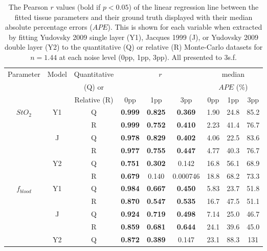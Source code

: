 \begin{table}[h!]
    \centering
    \caption{The Pearson $r$ values (bold if $p<0.05$) of the linear regression line between the fitted tissue parameters and their ground truth displayed with their median absolute percentage errors ($APE$). This is shown for each variable when extracted by fitting Yudovsky 2009 single layer (Y1), Jacques 1999 (J), or Yudovsky 2009 double layer (Y2) to the quantitative (Q) or relative (R) Monte-Carlo datasets for $n=1.44$ at each noise level (0pp, 1pp, 3pp). All presented to 3s.f.}
    \begin{tabular}{|ccc|ccc|ccc|}
        \hline
        Parameter & Model & Quantitative & \multicolumn{3}{c}{$r$} & \multicolumn{3}{|c|}{median} \\
        & & (Q) or & \multicolumn{3}{c}{} & \multicolumn{3}{|c|}{$APE$ (\%)} \\
        & & Relative (R) & 0pp & 1pp & 3pp & 0pp & 1pp & 3pp \\
        \hline
        \multirow{6}{*}{$StO_2$} & \multirow{2}{*}{Y1} & Q & \textbf{0.999} & \textbf{0.825} & \textbf{0.369} & 1.90 & 24.8 & 85.2 \\
        & & R & \textbf{0.999} & \textbf{0.752} & \textbf{0.410} & 2.23 & 41.4 & 76.7 \\
        \cline{2-9}
        & \multirow{2}{*}{J} & Q & \textbf{0.978} & \textbf{0.829} & \textbf{0.402} & 4.06 & 22.5 & 83.6 \\
        & & R & \textbf{0.977} & \textbf{0.755} & \textbf{0.447} & 4.77 & 40.3 & 76.7 \\
        \cline{2-9}
        & \multirow{2}{*}{Y2} & Q & \textbf{0.751} & \textbf{0.302} & 0.142 & 16.8 & 56.1 & 68.9 \\
        & & R & \textbf{0.679} & 0.140 & 0.000746 & 18.8 & 68.2 & 73.3 \\
        \hline
        \multirow{6}{*}{$f_{blood}$} & \multirow{2}{*}{Y1} & Q & \textbf{0.984} & \textbf{0.667} & \textbf{0.450} & 5.83 & 23.7 & 51.8\\
        & & R & \textbf{0.870} & \textbf{0.547} & \textbf{0.535} & 16.7 & 47.5 & 51.1\\
        \cline{2-9}
        & \multirow{2}{*}{J} & Q & \textbf{0.924} & \textbf{0.719} & \textbf{0.498} & 7.14 & 25.0 & 46.7 \\
        & & R & \textbf{0.859} & \textbf{0.681} & \textbf{0.644} & 24.1 & 39.6 & 45.0 \\
        \cline{2-9}
        & \multirow{2}{*}{Y2} & Q & \textbf{0.872} & \textbf{0.389} & 0.147 & 23.1 & 88.3 & 131 \\

\end{tabular}
\end{table}
